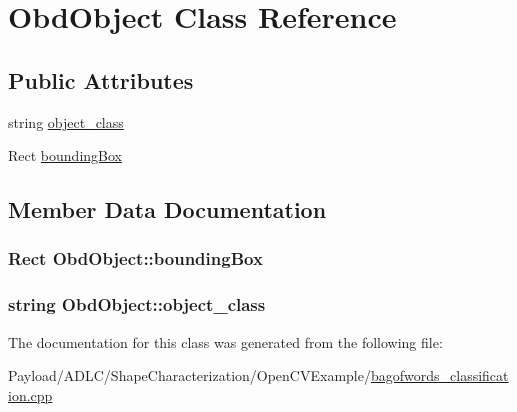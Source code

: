 \hypertarget{classObdObject}{\section{Obd\-Object Class Reference}
\label{classObdObject}
}
\subsection*{Public Attributes}
\begin{DoxyCompactItemize}
\item 
string \hyperlink{classObdObject_ab40b6b9c31790ccd4da01a182802ab9c}{object\-\_\-class}
\item 
Rect \hyperlink{classObdObject_a06c5689641c3dc7f6e6ac3e2a28e2240}{bounding\-Box}
\end{DoxyCompactItemize}


\subsection{Member Data Documentation}
\hypertarget{classObdObject_a06c5689641c3dc7f6e6ac3e2a28e2240}{
\subsubsection[{bounding\-Box}]{\setlength{\rightskip}{0pt plus 5cm}Rect Obd\-Object\-::bounding\-Box}}\label{classObdObject_a06c5689641c3dc7f6e6ac3e2a28e2240}
\hypertarget{classObdObject_ab40b6b9c31790ccd4da01a182802ab9c}{
\subsubsection[{object\-\_\-class}]{\setlength{\rightskip}{0pt plus 5cm}string Obd\-Object\-::object\-\_\-class}}\label{classObdObject_ab40b6b9c31790ccd4da01a182802ab9c}


The documentation for this class was generated from the following file\-:\begin{DoxyCompactItemize}
\item 
Payload/\-A\-D\-L\-C/\-Shape\-Characterization/\-Open\-C\-V\-Example/\hyperlink{bagofwords__classification_8cpp}{bagofwords\-\_\-classification.\-cpp}\end{DoxyCompactItemize}
